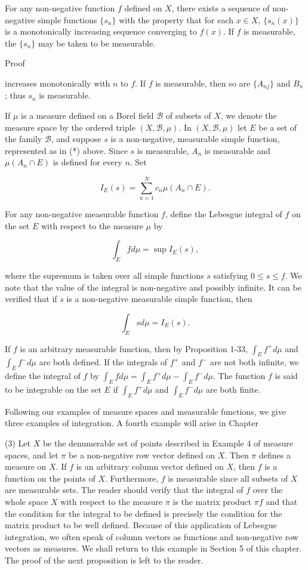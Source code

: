 For any non-negative function $f$ defined on $X$, there exists a sequence of non-negative simple functions $\{s_n\}$ with the property that for each $x \in X$, $\{s_n(x)\}$ is a monotonically increasing sequence converging to $f(x)$. If $f$ is measurable, the $\{s_n\}$ may be taken to be measurable.

Proof

increases monotonically with $n$ to $f$. If $f$ is measurable, then so are $\{A_{nj}\}$ and $B_n$; thus $s_n$ is measurable.

If $\mu$ is a measure defined on a Borel field $\mathcal{B}$ of subsets of $X$, we denote the measure space by the ordered triple $(X, \mathcal{B}, \mu)$. In $(X, \mathcal{B}, \mu)$ let $E$ be a set of the family $\mathcal{B}$, and suppose $s$ is a non-negative, measurable simple function, represented as in (*) above. Since $s$ is measurable, $A_n$ is measurable and $\mu(A_n \cap E)$ is defined for every $n$. Set

$$I_E(s) = \sum_{n=1}^{N} c_n \mu(A_n \cap E).$$

For any non-negative measurable function $f$, define the Lebesgue integral of $f$ on the set $E$ with respect to the measure $\mu$ by

$$\int_E f d\mu = \sup I_E(s),$$

where the supremum is taken over all simple functions $s$ satisfying $0 \leq s \leq f$. We note that the value of the integral is non-negative and possibly infinite. It can be verified that if $s$ is a non-negative measurable simple function, then

$$\int_E s d\mu = I_E(s).$$

If $f$ is an arbitrary measurable function, then by Proposition 1-33, $\int_E f^+ d\mu$ and $\int_E f^- d\mu$ are both defined. If the integrals of $f^+$ and $f^-$ are not both infinite, we define the integral of $f$ by $\int_E f d\mu = \int_E f^+ d\mu - \int_E f^- d\mu$. The function $f$ is said to be integrable on the set $E$ if $\int_E f^+ d\mu$ and $\int_E f^- d\mu$ are both finite.

Following our examples of measure spaces and measurable functions, we give three examples of integration. A fourth example will arise in Chapter

(3) Let $X$ be the denumerable set of points described in Example 4 of measure spaces, and let $\pi$ be a non-negative row vector defined on $X$. Then $\pi$ defines a measure on $X$. If $f$ is an arbitrary column vector defined on $X$, then $f$ is a function on the points of $X$. Furthermore, $f$ is measurable since all subsets of $X$ are measurable sets. The reader should verify that the integral of $f$ over the whole space $X$ with respect to the measure $\pi$ is the matrix product $\pi f$ and that the condition for the integral to be defined is precisely the condition for the matrix product to be well defined. Because of this application of Lebesgue integration, we often speak of column vectors as functions and non-negative row vectors as measures. We shall return to this example in Section 5 of this chapter. The proof of the next proposition is left to the reader.
